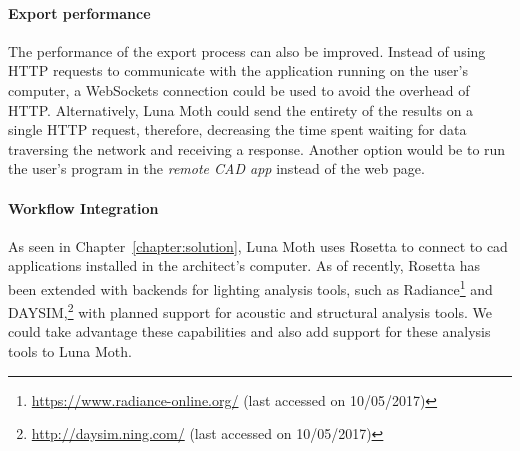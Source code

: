 \paragraph{Export performance}
The performance of the export process can also be improved.
Instead of using HTTP requests to communicate with the application running on the user's computer, a WebSockets connection\cite{rfc6455} could be used to avoid the overhead of HTTP.
Alternatively, Luna Moth could send the entirety of the results on a single HTTP request, therefore, decreasing the time spent waiting for data traversing the network and receiving a response.
Another option would be to run the user's program in the \textit{remote CAD app} instead of the web page.

\paragraph{Workflow Integration}
As seen in Chapter~\ref{chapter:solution}, Luna Moth uses Rosetta to connect to \gls{cad} applications installed in the architect's computer.
As of recently\cite{branco2017algoanalysis}, Rosetta has been extended with backends for lighting analysis tools, such as Radiance\footnote{\url{https://www.radiance-online.org/} (last accessed on 10/05/2017)} and DAYSIM,\footnote{\url{http://daysim.ning.com/} (last accessed on 10/05/2017)} with planned support for acoustic and structural analysis tools.
We could take advantage these capabilities and also add support for these analysis tools to Luna Moth.











